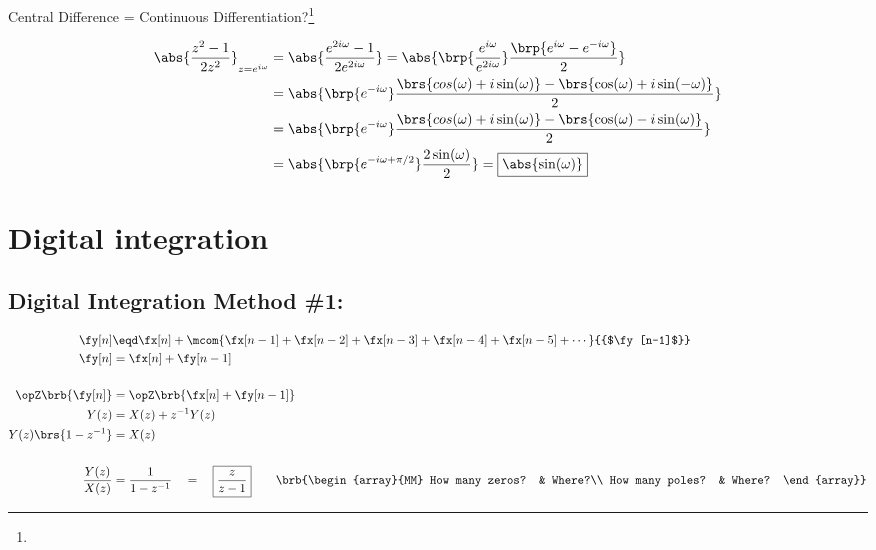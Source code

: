 Central Difference = Continuous Differentiation?\footnote{}
 
\begin{align*}
  \abs{\frac{z^2-1}{2z^2}}_{z=e^{i\omega}}
    &= \abs{\frac{e^{2i\omega}-1}
                 {2e^{2i\omega}}
           }
     = \abs{\brp{\frac{e^{i\omega}}{e^{2i\omega}}}
            \frac{\brp{e^{i\omega}-e^{-i\omega}}}{2}
           }
  \\&= \abs{\brp{e^{-i\omega}}
            \frac{\brs{cos(\omega)+i\sin(\omega)}-\brs{\cos(\omega)+i\sin(-\omega)}}{2}
           }
  \\&= \abs{\brp{e^{-i\omega}}
            \frac{\brs{cos(\omega)+i\sin(\omega)}-\brs{\cos(\omega)-i\sin(\omega)}}{2}
           }
  \\&= \abs{\brp{e^{-i\omega+\pi/2}}
            \frac{2\sin(\omega)}{2}
           }
     = \boxed{\abs{\sin(\omega)}}
\end{align*}


\section{Digital integration}
\subsection{Digital Integration Method \#1: }

{\begin{align*}
  \fy[n]
    &\eqd \fx[n] + \mcom{\fx[n-1] + \fx[n-2] + \fx[n-3] + \fx[n-4] + \fx[n-5] + \cdots}{{$\fy[n-1]$}}
  \\
  \fy[n] &=    \fx[n] + \fy[n-1]
  \\\\
  \opZ\brb{\fy[n]} &= \opZ\brb{\fx[n] + \fy[n-1]}
  \\
  Y(z) &= X(z) + z^{-1}Y(z)
  \\
  Y(z)\brs{1-z^{-1}} &= X(z)
  \\\\
  \frac{Y(z)}{X(z)} &= \frac{1}{1-z^{-1}} \quad=\quad \boxed{\frac{z}{z-1}}
  \qquad\brb{\begin{array}{MM}
    How many zeros? & Where?\\
    How many poles? & Where?
  \end{array}}
\end{align*}}


